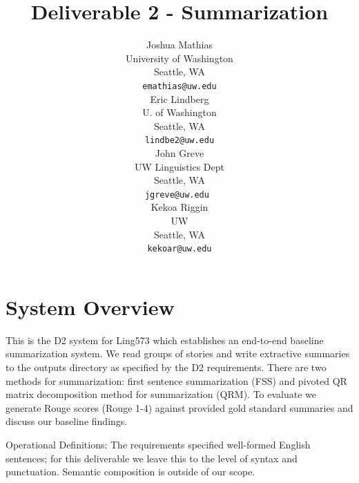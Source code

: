 \documentclass[11pt,a4paper]{article}
\title{Deliverable 2 - Summarization}
\author{Joshua Mathias \\
  University of Washington \\
  Seattle, WA \\
  {\tt emathias@uw.edu} 
  \\\And 
  Eric Lindberg \\
  U. of Washington \\
  Seattle, WA \\
  {\tt lindbe2@uw.edu} 
  \\\And 
  John Greve \\
  UW Linguistics Dept \\
  Seattle, WA \\
  {\tt jgreve@uw.edu } 
  \\\And 
  Kekoa Riggin \\
  UW \\
  Seattle, WA \\
  {\tt kekoar@uw.edu} 
    }
\date{}
\begin{document}
\maketitle

\section{System Overview}
This is the D2 system for Ling573 which establishes an end-to-end baseline summarization system. We read groups of stories and write extractive summaries to the outputs directory as specified by the D2 requirements. There are two methods for summarization: first sentence summarization (FSS) and pivoted QR matrix decomposition method for summarization (QRM). To evaluate we generate Rouge scores (Rouge 1-4) against provided gold standard summaries and discuss our baseline findings.

Operational Definitions: The requirements specified well-formed English sentences; for this deliverable we leave this to the level of syntax and punctuation. Semantic composition is outside of our scope.
\end{document}
